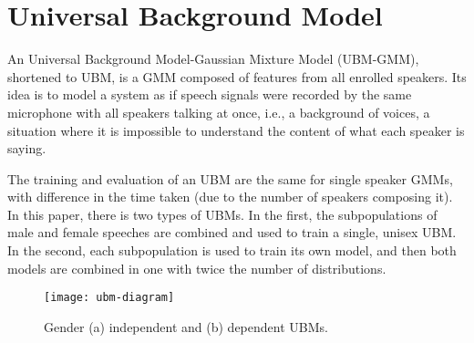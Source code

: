 \section{Universal Background Model}

An Universal Background Model-Gaussian Mixture Model (UBM-GMM), shortened to UBM, is a GMM composed of features from all enrolled speakers. Its idea is to model a system as if speech signals were recorded by the same microphone with all speakers talking at once, i.e., a background of voices, a situation where it is impossible to understand the content of what each speaker is saying.

The training and evaluation of an UBM are the same for single speaker GMMs, with difference in the time taken (due to the number of speakers composing it). In this paper, there is two types of UBMs. In the first, the subpopulations of male and female speeches are combined and used to train a single, unisex UBM. In the second, each subpopulation is used to train its own model, and then both models are combined in one with twice the number of distributions.

\begin{figure}[ht]
    \centering
    \texttt{[image: ubm-diagram]}
    \caption{Gender (a) independent and (b) dependent UBMs. }
    \label{fig:ubm-diagram}
\end{figure}